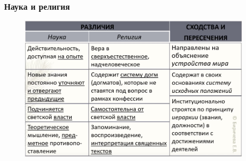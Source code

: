 


\subsubsection{Наука и религия}

\begin{figure}[H]
    \centering
    \includegraphics[width=0.8\linewidth]{pictures/scirel.png}
    \label{scirel}
\end{figure}


